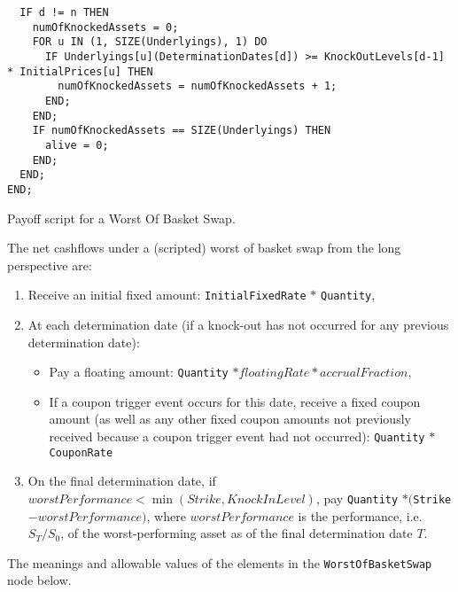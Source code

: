 \begin{listing}[hbt]
\begin{verbatim}
  IF d != n THEN
    numOfKnockedAssets = 0;
    FOR u IN (1, SIZE(Underlyings), 1) DO
      IF Underlyings[u](DeterminationDates[d]) >= KnockOutLevels[d-1] * InitialPrices[u] THEN
        numOfKnockedAssets = numOfKnockedAssets + 1;
      END;
    END;
    IF numOfKnockedAssets == SIZE(Underlyings) THEN
      alive = 0;
    END;
  END;
END;
\end{verbatim} 
\caption{Payoff script for a Worst Of Basket Swap.} 
\label{lst:worst_of_basket_swap}
\end{listing} 
 
The net cashflows under a (scripted) worst of basket swap from the long perspective are:
\begin{enumerate}
  \item Receive an initial fixed amount: \lstinline!InitialFixedRate! $*$ \lstinline!Quantity!,
  \item At each determination date (if a knock-out has not occurred for any previous determination date): \begin{itemize}
      \item Pay a floating amount: \lstinline!Quantity! $* floatingRate * accrualFraction$,
      \item If a coupon trigger event occurs for this date, receive a fixed coupon amount (as well as any other fixed coupon amounts not previously received because a coupon trigger event had not occurred): \lstinline!Quantity! $*$ \lstinline!CouponRate!
    \end{itemize}
  \item On the final determination date, if $worstPerformance < \min(Strike, KnockInLevel)$, pay \lstinline!Quantity! $* ($\lstinline!Strike!$ - worstPerformance)$, where $worstPerformance$ is the performance, i.e.\ $S_T/S_0$, of the worst-performing asset as of the final determination date $T$.
\end{enumerate}

The meanings and allowable values of the elements in the \lstinline!WorstOfBasketSwap! node below.

